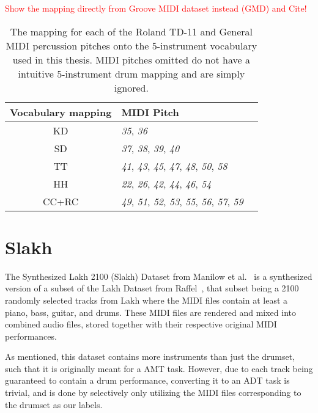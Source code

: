 \textcolor{red}{Show the mapping directly from Groove MIDI dataset instead (GMD) and Cite!}

\begin{table}[H]
    \centering
    \hspace*{-0.6cm}
    \begin{tabular}{c|ll}
        Vocabulary mapping & MIDI Pitch \\
        \hline
        \acrfull{KD} & \textit{35}, \textit{36} \\
        \acrfull{SD} & \textit{37}, \textit{38}, \textit{39}, \textit{40} \\
        \acrfull{TT} & \textit{41}, \textit{43}, \textit{45}, \textit{47}, \textit{48}, \textit{50}, \textit{58} \\
        \acrfull{HH} & \textit{22}, \textit{26}, \textit{42}, \textit{44}, \textit{46}, \textit{54} \\
        \acrfull{CC+RC} & \textit{49}, \textit{51}, \textit{52}, \textit{53}, \textit{55}, \textit{56}, \textit{57}, \textit{59} \\
    \end{tabular}
    \caption{The mapping for each of the Roland TD-11 and General MIDI percussion pitches onto the 5-instrument vocabulary used in this thesis. MIDI pitches omitted do not have a intuitive 5-instrument drum mapping and are simply ignored.}
    \label{RolandMIDIMapping}
\end{table}

\section{Slakh}

The Synthesized Lakh 2100 (Slakh) Dataset from Manilow et al.~\cite{8937170} is a synthesized version of a subset of the Lakh Dataset from Raffel~\cite{raffel2016learning}, that subset being a 2100 randomly selected tracks from Lakh where the MIDI files contain at least a piano, bass, guitar, and drums. These MIDI files are rendered and mixed into combined audio files, stored together with their respective original MIDI performances.

As mentioned, this dataset contains more instruments than just the drumset, such that it is originally meant for a \gls{AMT} task. However, due to each track being guaranteed to contain a drum performance, converting it to an \gls{ADT} task is trivial, and is done by selectively only utilizing the MIDI files corresponding to the drumset as our labels.

